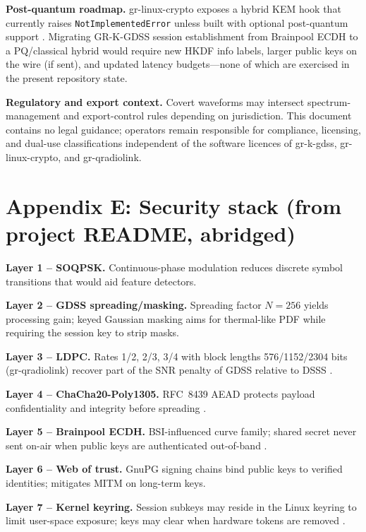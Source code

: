 \documentclass[10pt,a4paper,twocolumn]{article}
\begin{document}
\vspace{0.5em}
\noindent\textbf{Post-quantum roadmap.} gr-linux-crypto exposes a hybrid KEM hook that currently raises \texttt{NotImplementedError} unless built with optional post-quantum support \cite{repo_crypto}. Migrating GR-K-GDSS session establishment from Brainpool ECDH to a PQ/classical hybrid would require new HKDF info labels, larger public keys on the wire (if sent), and updated latency budgets---none of which are exercised in the present repository state.

\vspace{0.5em}
\noindent\textbf{Regulatory and export context.} Covert waveforms may intersect spectrum-management and export-control rules depending on jurisdiction. This document contains no legal guidance; operators remain responsible for compliance, licensing, and dual-use classifications independent of the software licences of gr-k-gdss, gr-linux-crypto, and gr-qradiolink.

\section*{Appendix E: Security stack (from project README, abridged)}
\noindent\textbf{Layer 1 -- SOQPSK.} Continuous-phase modulation reduces discrete symbol transitions that would aid feature detectors.

\noindent\textbf{Layer 2 -- GDSS spreading/masking.} Spreading factor $N{=}256$ yields processing gain; keyed Gaussian masking aims for thermal-like PDF while requiring the session key to strip masks.

\noindent\textbf{Layer 3 -- LDPC.} Rates 1/2, 2/3, 3/4 with block lengths 576/1152/2304 bits (gr-qradiolink) recover part of the SNR penalty of GDSS relative to DSSS \cite{shakeel2023,chung2001}.

\noindent\textbf{Layer 4 -- ChaCha20-Poly1305.} RFC~8439 AEAD protects payload confidentiality and integrity before spreading \cite{rfc8439}.

\noindent\textbf{Layer 5 -- Brainpool ECDH.} BSI-influenced curve family; shared secret never sent on-air when public keys are authenticated out-of-band \cite{rfc5639,bsi2018}.

\noindent\textbf{Layer 6 -- Web of trust.} GnuPG signing chains bind public keys to verified identities; mitigates MITM on long-term keys.

\noindent\textbf{Layer 7 -- Kernel keyring.} Session subkeys may reside in the Linux keyring to limit user-space exposure; keys may clear when hardware tokens are removed \cite{repo_gdss}.
\end{document}
